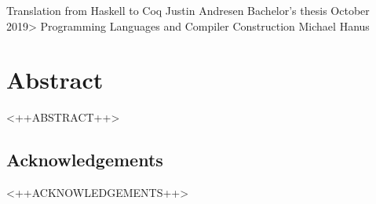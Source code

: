 \documentclass[10pt]{book}
\begin{document}
\frontmatter

\studtitlepage%
  {Translation from Haskell to Coq}
  {}%
  {Justin Andresen}%
  {Bachelor's thesis}%
  {October 2019>}%
  {Programming Languages and Compiler Construction}%
  {Michael Hanus}
\cleardoublepage
\eidesstatt

\chapter*{Abstract}
<++ABSTRACT++>

\section*{Acknowledgements}
<++ACKNOWLEDGEMENTS++>

\tableofcontents
\mainmatter

\appendix

\backmatter
\nocite{*} %
\tocbibliography
\end{document}
